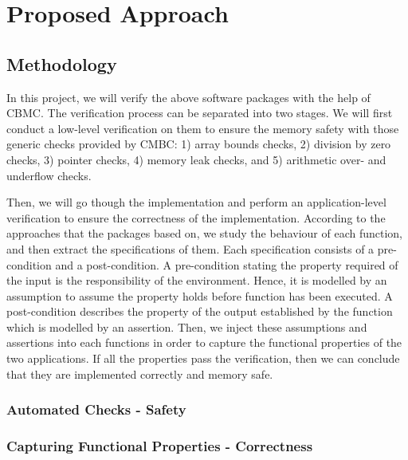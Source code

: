 \chapter{Proposed Approach} %

\section{Methodology}
In this project, we will verify the above software packages with the help of CBMC. The verification process can be separated into two stages. We will first conduct a low-level verification on them to ensure the memory safety with those generic checks provided by CMBC: 1) array bounds checks, 2) division by zero checks, 3) pointer checks, 4) memory leak checks, and 5) arithmetic over- and underflow checks.

Then, we will go though the implementation and perform an application-level verification to ensure the correctness of the implementation. According to the approaches that the packages based on, we study the behaviour of each function, and then extract the specifications of them. Each specification consists of a pre-condition and a post-condition. A pre-condition stating the property required of the input is the responsibility of the environment. Hence, it is modelled by an assumption to assume the property holds before function has been executed. A post-condition describes the property of the output established by the function which is modelled by an assertion. Then, we inject these assumptions and assertions into each functions in order to capture the functional properties of the two applications. If all the properties pass the verification, then we can conclude that they are implemented correctly and memory safe.

\subsection{Automated Checks - Safety}

\subsection{Capturing Functional Properties - Correctness}